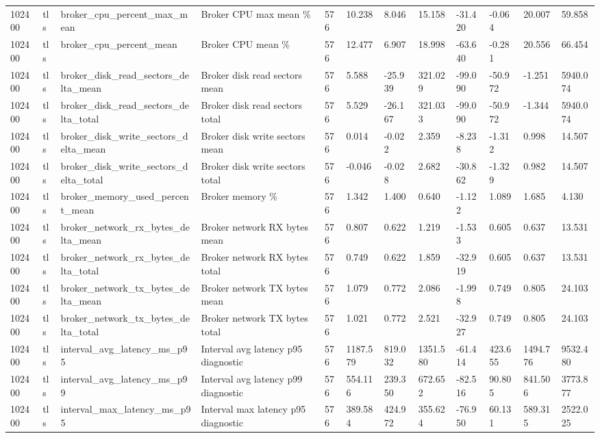 \begin{longtable}{llllllllllll}
102400 & tls & broker\_cpu\_percent\_max\_mean & Broker CPU max mean \% & 576 & 10.238 & 8.046 & 15.158 & -31.420 & -0.064 & 20.007 & 59.858 \\
102400 & tls & broker\_cpu\_percent\_mean & Broker CPU mean \% & 576 & 12.477 & 6.907 & 18.998 & -63.640 & -0.281 & 20.556 & 66.454 \\
102400 & tls & broker\_disk\_read\_sectors\_delta\_mean & Broker disk read sectors mean & 576 & 5.588 & -25.939 & 321.029 & -99.090 & -50.972 & -1.251 & 5940.074 \\
102400 & tls & broker\_disk\_read\_sectors\_delta\_total & Broker disk read sectors total & 576 & 5.529 & -26.167 & 321.033 & -99.090 & -50.972 & -1.344 & 5940.074 \\
102400 & tls & broker\_disk\_write\_sectors\_delta\_mean & Broker disk write sectors mean & 576 & 0.014 & -0.022 & 2.359 & -8.238 & -1.312 & 0.998 & 14.507 \\
102400 & tls & broker\_disk\_write\_sectors\_delta\_total & Broker disk write sectors total & 576 & -0.046 & -0.028 & 2.682 & -30.862 & -1.329 & 0.982 & 14.507 \\
102400 & tls & broker\_memory\_used\_percent\_mean & Broker memory \% & 576 & 1.342 & 1.400 & 0.640 & -1.122 & 1.089 & 1.685 & 4.130 \\
102400 & tls & broker\_network\_rx\_bytes\_delta\_mean & Broker network RX bytes mean & 576 & 0.807 & 0.622 & 1.219 & -1.533 & 0.605 & 0.637 & 13.531 \\
102400 & tls & broker\_network\_rx\_bytes\_delta\_total & Broker network RX bytes total & 576 & 0.749 & 0.622 & 1.859 & -32.919 & 0.605 & 0.637 & 13.531 \\
102400 & tls & broker\_network\_tx\_bytes\_delta\_mean & Broker network TX bytes mean & 576 & 1.079 & 0.772 & 2.086 & -1.998 & 0.749 & 0.805 & 24.103 \\
102400 & tls & broker\_network\_tx\_bytes\_delta\_total & Broker network TX bytes total & 576 & 1.021 & 0.772 & 2.521 & -32.927 & 0.749 & 0.805 & 24.103 \\
102400 & tls & interval\_avg\_latency\_ms\_p95 & Interval avg latency p95 diagnostic & 576 & 1187.579 & 819.032 & 1351.580 & -61.414 & 423.655 & 1494.776 & 9532.480 \\
102400 & tls & interval\_avg\_latency\_ms\_p99 & Interval avg latency p99 diagnostic & 576 & 554.116 & 239.350 & 672.652 & -82.516 & 90.805 & 841.506 & 3773.877 \\
102400 & tls & interval\_max\_latency\_ms\_p95 & Interval max latency p95 diagnostic & 576 & 389.584 & 424.972 & 355.624 & -76.950 & 60.131 & 589.315 & 2522.025 \\

\end{longtable}
